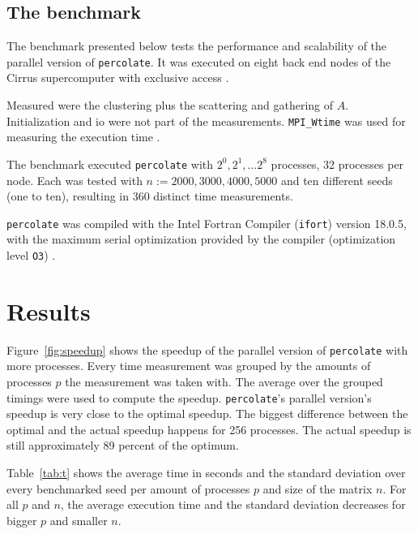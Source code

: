\documentclass[twoside,11pt]{article}
\def\perc{\texttt{perco\-late}}
\begin{document}


\subsection{The benchmark}
\label{subsec:bench}

The benchmark presented below tests the performance and
scalability of the parallel version of \perc{}.
It was executed on eight back end nodes of the Cirrus
supercomputer with exclusive access \citep[see][]{cirrus}.

Measured were the clustering plus the scattering and
gathering of $A$.
Initialization and io were not part of the measurements.
\texttt{MPI\_Wtime} was used for measuring the execution
time \citep[see][Chapter 8]{mpi}.

The benchmark executed \perc{} with $2^0,2^1,\dots2^8$
processes, 32 processes per node.
Each was tested with $n := 2000, 3000, 4000, 5000$
and ten different seeds (one to ten), resulting in 360
distinct time measurements.

\perc{} was compiled with the Intel Fortran Compiler
(\texttt{ifort}) version 18.0.5, with the maximum serial
optimization provided by the compiler (optimization level
\texttt{O3}) \citep[see][]{ifort}.



\section{Results} %

Figure~\ref{fig:speedup} shows the speedup of the parallel
version of \perc{} with more processes.
Every time measurement was grouped by the amounts of
processes $p$ the measurement was taken with.
The average over the grouped timings were used to compute
the speedup.
\perc{}'s parallel version's speedup is very close to the
optimal speedup.
The biggest difference between the optimal and the actual
speedup happens for 256 processes.
The actual speedup is still approximately 89 percent of the
optimum.

Table~\ref{tab:t} shows the average time in seconds and
the standard deviation over every benchmarked seed per
amount of processes $p$ and size of the matrix $n$.
For all $p$ and $n$, the average execution time and the
standard deviation decreases for bigger $p$ and smaller
$n$.
\end{document}
